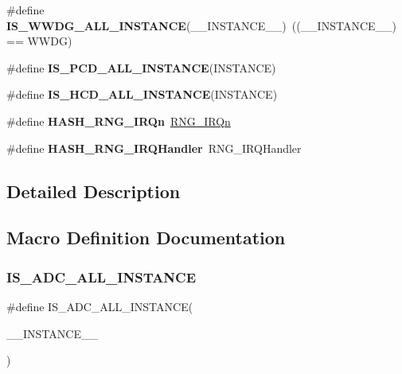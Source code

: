 \begin{DoxyCompactItemize}
\item 
\mbox{\label{group___exported__macros_gad7f7b2c0e6b3dc6f86e1b7d551bc8160}} 
\#define {\bfseries I\+S\+\_\+\+W\+W\+D\+G\+\_\+\+A\+L\+L\+\_\+\+I\+N\+S\+T\+A\+N\+CE}(\+\_\+\+\_\+\+I\+N\+S\+T\+A\+N\+C\+E\+\_\+\+\_\+)~((\+\_\+\+\_\+\+I\+N\+S\+T\+A\+N\+C\+E\+\_\+\+\_\+) == W\+W\+DG)
\item 
\#define {\bfseries I\+S\+\_\+\+P\+C\+D\+\_\+\+A\+L\+L\+\_\+\+I\+N\+S\+T\+A\+N\+CE}(I\+N\+S\+T\+A\+N\+CE)
\item 
\#define {\bfseries I\+S\+\_\+\+H\+C\+D\+\_\+\+A\+L\+L\+\_\+\+I\+N\+S\+T\+A\+N\+CE}(I\+N\+S\+T\+A\+N\+CE)
\item 
\mbox{\label{group___exported__macros_ga70479d84b2227bd03eca17d75ced09c1}} 
\#define {\bfseries H\+A\+S\+H\+\_\+\+R\+N\+G\+\_\+\+I\+R\+Qn}~\mbox{\hyperlink{group___configuration__section__for___c_m_s_i_s_gga7e1129cd8a196f4284d41db3e82ad5c8a90c4647e57cff99fac635c532802c4b5}{R\+N\+G\+\_\+\+I\+R\+Qn}}
\item 
\mbox{\label{group___exported__macros_ga02197754de1bce261e192d5e5221f20e}} 
\#define {\bfseries H\+A\+S\+H\+\_\+\+R\+N\+G\+\_\+\+I\+R\+Q\+Handler}~R\+N\+G\+\_\+\+I\+R\+Q\+Handler
\end{DoxyCompactItemize}


\subsection{Detailed Description}


\subsection{Macro Definition Documentation}
\mbox{\label{group___exported__macros_gaeac7a787d73a78a847467ce6b867bd7f}} 
\subsubsection{\texorpdfstring{IS\_ADC\_ALL\_INSTANCE}{IS\_ADC\_ALL\_INSTANCE}}
{\footnotesize\ttfamily \#define I\+S\+\_\+\+A\+D\+C\+\_\+\+A\+L\+L\+\_\+\+I\+N\+S\+T\+A\+N\+CE(\begin{DoxyParamCaption}\item[{}]{\+\_\+\+\_\+\+I\+N\+S\+T\+A\+N\+C\+E\+\_\+\+\_\+ }\end{DoxyParamCaption})}


